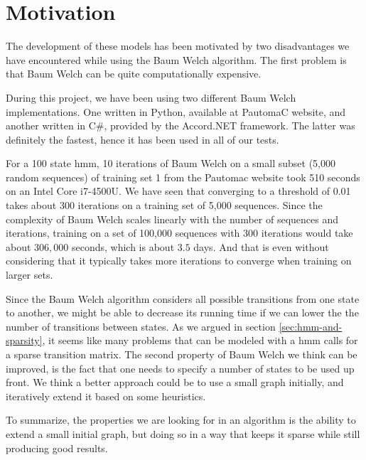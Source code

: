 \section{Motivation}
The development of these models has been motivated by two disadvantages we have encountered while using the Baum Welch algorithm.
The first problem is that Baum Welch can be quite computationally expensive.

During this project, we have been using two different Baum Welch implementations. One written in Python, available at PautomaC website, and another written in C\#, provided by the Accord.NET framework. The latter was definitely the fastest, hence it has been used in all of our tests.

For a 100 state \gls{hmm}, 10 iterations of Baum Welch on a small subset (5,000 random sequences) of training set 1 from the Pautomac website took 510 seconds on an Intel Core i7-4500U. We have seen that converging to a threshold of 0.01 takes about 300 iterations on a training set of 5,000 sequences. Since the complexity of Baum Welch scales linearly with the number of sequences and iterations, training on a set of 100,000 sequences with 300 iterations would take about $306,000$ seconds, which is about $3.5$ days. And that is even without considering that it typically takes more iterations to converge when training on larger sets. 

Since the Baum Welch algorithm considers all possible transitions from one state to another, we might be able to decrease its running time if we can lower the the number of transitions between states. As we argued in section \ref{sec:hmm-and-sparsity}, it seems like many problems that can be modeled with a \gls{hmm} calls for a sparse transition matrix.
The second property of Baum Welch we think can be improved, is the fact that one needs to specify a number of states to be used up front.
We think a better approach could be to use a small graph initially, and iteratively extend it based on some heuristics.

To summarize, the properties we are looking for in an algorithm is the ability to extend a small initial graph, but doing so in a way that keeps it sparse while still producing good results.